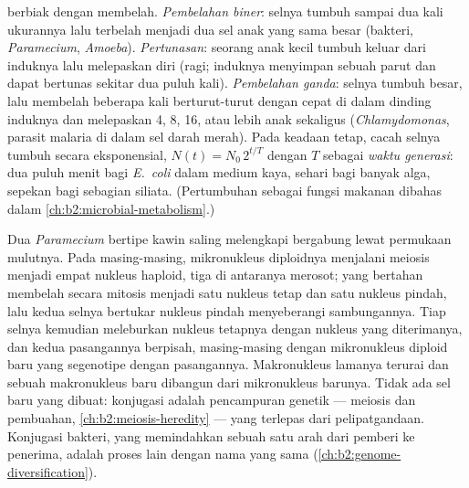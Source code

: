 \begin{definition}\label{def:b2:unicellular-diversity:division}
 berbiak dengan membelah. \emph{Pembelahan
biner}: selnya tumbuh sampai dua kali ukurannya lalu terbelah menjadi
dua sel anak yang sama besar (bakteri, \emph{Paramecium},
\emph{Amoeba}). \emph{Pertunasan}: seorang anak kecil tumbuh keluar
dari induknya lalu melepaskan diri (ragi; induknya menyimpan sebuah
parut dan dapat bertunas sekitar dua puluh kali). \emph{Pembelahan
ganda}: selnya tumbuh besar, lalu membelah beberapa kali berturut-turut
dengan cepat di dalam dinding induknya dan melepaskan 4, 8, 16, atau
lebih anak sekaligus (\emph{Chlamydomonas}, parasit malaria di dalam
sel darah merah). Pada keadaan tetap, cacah selnya tumbuh secara
eksponensial, $N(t) = N_0\,2^{t/T}$ dengan $T$ sebagai \emph{waktu
generasi}: dua puluh menit bagi \emph{E.~coli}
dalam medium kaya, sehari bagi banyak alga, sepekan bagi sebagian
siliata. (Pertumbuhan sebagai fungsi makanan dibahas dalam
\cref{ch:b2:microbial-metabolism}.)
\end{definition}

\begin{proposition}\label{prop:b2:unicellular-diversity:conjugation}
Dua \emph{Paramecium} bertipe kawin saling melengkapi bergabung lewat
permukaan mulutnya. Pada masing-masing, mikronukleus diploidnya
menjalani meiosis menjadi empat nukleus haploid, tiga di antaranya
merosot; yang bertahan membelah secara mitosis menjadi satu nukleus
tetap dan satu nukleus pindah, lalu kedua selnya bertukar nukleus
pindah menyeberangi sambungannya. Tiap selnya kemudian meleburkan
nukleus tetapnya dengan nukleus yang diterimanya, dan kedua pasangannya
berpisah, masing-masing dengan mikronukleus diploid baru yang segenotipe
dengan pasangannya. Makronukleus lamanya terurai dan sebuah makronukleus
baru dibangun dari mikronukleus barunya. Tidak ada sel baru yang dibuat:
konjugasi adalah pencampuran genetik --- meiosis dan pembuahan,
\cref{ch:b2:meiosis-heredity} --- yang terlepas dari pelipatgandaan.
Konjugasi bakteri, yang memindahkan sebuah  satu arah dari
pemberi ke penerima, adalah proses lain dengan nama yang sama
(\cref{ch:b2:genome-diversification}).
\end{proposition}

